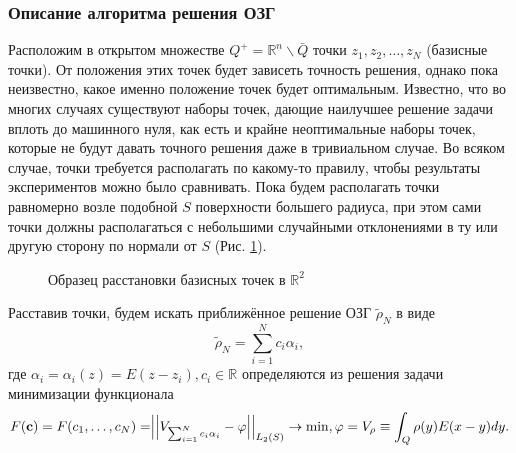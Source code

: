 \documentclass[a4paper]{article}
\newcommand{\V}[1]{\int_Q #1(y) E(x-y) dy}
\newcommand{\R}[1]{\mathbb{R}^#1}
\begin{document}
\subsubsection{Описание алгоритма решения ОЗГ}
Расположим в открытом множестве $Q^+= \R{n}\backslash \bar Q$ точки $z_1,z_2,\dots,z_N$ (базисные точки). От положения этих точек будет зависеть точность решения, однако пока неизвестно, какое именно положение точек будет оптимальным.
Известно, что во многих случаях существуют наборы точек, дающие наилучшее решение задачи вплоть до машинного нуля, как есть и крайне неоптимальные наборы точек, которые не будут давать точного решения даже в тривиальном случае.
Во всяком случае, точки требуется располагать по какому-то правилу, чтобы результаты экспериментов можно было сравнивать.
Пока будем располагать точки равномерно возле подобной $S$ поверхности большего радиуса, при этом сами точки должны располагаться с небольшими случайными отклонениями в ту или другую сторону по нормали от $S$ (Рис. \ref{sample}).

\begin{figure}[!h]
    \noindent{}
    \caption{Образец расстановки базисных точек в $\R{2}$}
    \label{sample}
\end{figure}


Расставив точки, будем искать приближённое решение ОЗГ $\tilde \rho_N$ в виде
\begin{equation}
    \tilde \rho_N=\sum_{i=1}^N c_i \alpha_i,
\end{equation}
где $\alpha_i=\alpha_i(z)=E(z-z_i),c_i \in \mathbb{R}$ определяются из решения задачи минимизации функционала
\begin{equation}
    F({\bf c})=F(c_1,\dots,c_N)=\Bigr|\Bigr|V_{\sum_{i=1}^N c_i \alpha_i} -\varphi\Bigr|\Bigr|_{L_2(S)} \rightarrow \min, \varphi =V_{\rho} \equiv \V{\rho}. 
\end{equation}
\end{document}
